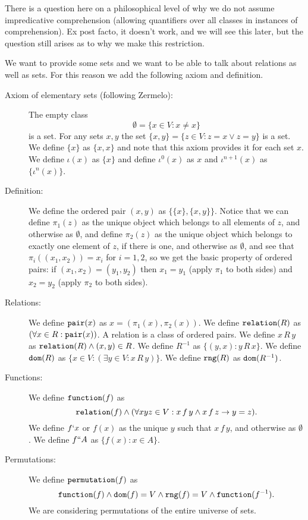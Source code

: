 \documentclass[12pt]{article}
\begin{document}
There is a question here on a philosophical level of why we do not assume impredicative comprehension (allowing quantifiers over all classes in instances of comprehension).  Ex post facto, it doesn't work, and we will see this later, but the question still arises as to why we make this restriction.

We want to provide some sets and we want to be able to talk about relations as well as sets.  For this reason we add the following axiom and definition.

\begin{description}

\item[Axiom of elementary sets (following Zermelo):]  The empty class $$\emptyset = \{x\in V:x \neq x\}$$ is a set.  For any sets $x,y$ the set $\{x,y\} = \{z\in V :z =x \vee z=y\}$ is a set.
We define $\{x\}$ as $\{x,x\}$ and note that this axiom provides it for each set $x$.  We define $\iota(x)$ as $\{x\}$ and define $\iota^0(x)$ as $x$ and $\iota^{n+1}(x)$ as $\{\iota^n(x)\}$.

\item[Definition:]  We define the ordered pair $(x,y)$ as $\{\{x\},\{x,y\}\}$.  Notice that we can define $\pi_1(z)$ as the unique object which belongs to all elements of $z$, and otherwise as $\emptyset$, and define $\pi_2(z)$ as the unique object which belongs to exactly one element of $z$, if there is one, and otherwise as $\emptyset$,
and see that $\pi_i((x_1,x_2)) = x_i$ for $i=1,2$, so we get the basic property of ordered pairs:  if $(x_1,x_2) = (y_1,y_2)$ then $x_1=y_1$ (apply $\pi_1$ to both sides) and $x_2=y_2$ (apply $\pi_2$ to both sides).

\item[Relations:]  We define ${\tt pair}(x)$ as $x=(\pi_1(x),\pi_2(x))$.  We define ${\tt relation}(R)$ as $(\forall x\in R:{\tt pair}(x))$.  A relation is a class of ordered pairs.  We define $x \, R\, y$ as ${\tt relation}(R) \wedge (x,y)\in R$.  We define $R^{-1}$ as $\{(y,x):y \, R\, x\}$.  We define
${\tt dom}(R)$ as $\{x\in V:(\exists y\in V:x \,R\,y)\}$.  We define ${\tt rng}(R)$ as ${\tt dom}(R^{-1})$.

\item[Functions:]  We define ${\tt function}(f)$ as $${\tt relation}(f) \wedge (\forall xyz \in V:x \,f\,y \wedge x\,f\,z \rightarrow y=z).$$   We define
$f`x$ or $f(x)$ as the unique $y$ such that $x\,f\,y$, and otherwise as $\emptyset$.  We define $f``A$ as $\{f(x):x \in A\}$.

\item[Permutations:]  We define ${\tt permutation}(f)$ as $${\tt function}(f) \wedge {\tt dom}(f)=V \wedge {\tt rng}(f)=V \wedge {\tt function}(f^{-1}).$$  We are considering permutations of the entire universe of sets.


\end{description}
\end{document}
